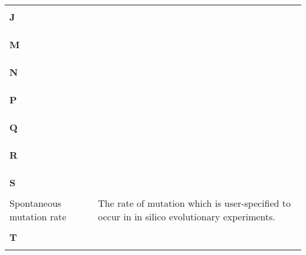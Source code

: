 \begin{longtable}{p{2.5cm}p{9.5cm}}
\\
\\
\huge{\textbf{J}}& \\
\hline
\\

\\
\\
\huge{\textbf{M}}& \\
\hline
\\

\\
\\
\huge{\textbf{N}}& \\
\hline
\\

\\
\\
\huge{\textbf{P}}& \\
\hline
\\

\\
\\
\huge{\textbf{Q}}& \\
\hline
\\

\\
\\
\huge{\textbf{R}}& \\
\hline
\\

\\
\\
\huge{\textbf{S}}& \\
\hline
\\
Spontaneous mutation rate& The rate of mutation which is user-specified to occur in in silico evolutionary experiments. 
\\
\\
\huge{\textbf{T}}& \\
\hline
\\


\end{longtable}
